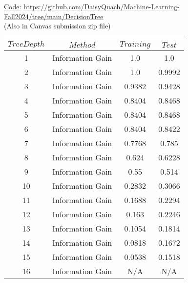 \documentclass[8pt, fullpage,letterpaper]{article}
\begin{document}
\begin{enumerate}
\begin{enumerate}
		\color{violet}

		\underline{Code:} \url{https://github.com/DaisyQuach/Machine-Learning-Fall2024/tree/main/DecisionTree}\\
		(Also in Canvas submission zip file)

		\begin{center}
			\begin{tabular}{c|c|c|c}
				\hline
				$Tree Depth$ & $Method$ & $Training $ & $Test $ \\ 
				\hline\hline\hline
				1 & Information Gain 		& 1.0 & 1.0  \\ \hline
				2 & Information Gain 		& 1.0 & 0.9992  \\ \hline
				3 & Information Gain 		& 0.9382 & 0.9428  \\ \hline
				4 & Information Gain 		& 0.8404 & 0.8468  \\ \hline
				5 & Information Gain 		& 0.8404 & 0.8468  \\ \hline
				6 & Information Gain 		& 0.8404 & 0.8422  \\ \hline
				7 & Information Gain 		& 0.7768 & 0.785  \\ \hline
				8 & Information Gain 		& 0.624 & 0.6228  \\ \hline
				9 & Information Gain 		& 0.55 & 0.514  \\ \hline
				10 & Information Gain 	& 0.2832 & 0.3066  \\ \hline
				11 & Information Gain 	& 0.1688 & 0.2294  \\ \hline
				12 & Information Gain 	& 0.163 & 0.2246  \\ \hline
				13 & Information Gain 	& 0.1054 & 0.1814  \\ \hline
				14 & Information Gain 	& 0.0818 & 0.1672  \\ \hline
				15 & Information Gain 	& 0.0538 & 0.1518  \\ \hline
				16 & Information Gain 	& N/A & N/A  \\ \hline\hline


\end{tabular}
\end{center}
\end{enumerate}
\end{enumerate}
\end{document}

